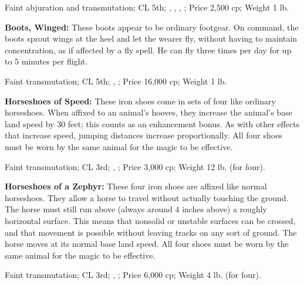 Faint abjuration and transmutation; CL 5th; , , , ; Price 2,500 cp; Weight 1 lb.

\textbf{Boots, Winged:} These boots appear to be ordinary footgear. On command, the boots sprout wings at the heel and let the wearer fly, without having to maintain concentration, as if affected by a fly spell. He can fly three times per day for up to 5 minutes per flight.

Faint transmutation; CL 5th; , ; Price 16,000 cp; Weight 1 lb.

\textbf{Horseshoes of Speed:} These iron shoes come in sets of four like ordinary horseshoes. When affixed to an animal's hooves, they increase the animal's base land speed by 30 feet; this counts as an enhancement bonus. As with other effects that increase speed, jumping distances increase proportionally. All four shoes must be worn by the same animal for the magic to be effective.

Faint transmutation; CL 3rd; , ; Price 3,000 cp; Weight 12 lb. (for four).

\textbf{Horseshoes of a Zephyr:} These four iron shoes are affixed like normal horseshoes. They allow a horse to travel without actually touching the ground. The horse must still run above (always around 4 inches above) a roughly horizontal surface. This means that nonsolid or unstable surfaces can be crossed, and that movement is possible without leaving tracks on any sort of ground. The horse moves at its normal base land speed. All four shoes must be worn by the same animal for the magic to be effective.

Faint transmutation; CL 3rd; , ; Price 6,000 cp; Weight 4 lb. (for four).